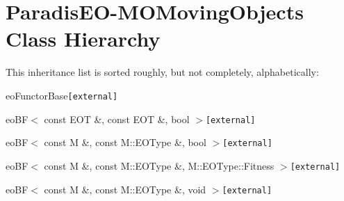 \section{ParadisEO-MOMovingObjects Class Hierarchy}
This inheritance list is sorted roughly, but not completely, alphabetically:\begin{CompactList}
\item {}
\item eoFunctorBase{\tt  [external]}\begin{CompactList}
\item eoBF$<$ const EOT \&, const EOT \&, bool $>${\tt  [external]}\begin{CompactList}
\item {}
\begin{CompactList}
\item {}
\end{CompactList}
\end{CompactList}
\item eoBF$<$ const M \&, const M::EOType \&, bool $>${\tt  [external]}\begin{CompactList}
\item {}
\begin{CompactList}
\item {}
\item {}
\end{CompactList}
\end{CompactList}
\item eoBF$<$ const M \&, const M::EOType \&, M::EOType::Fitness $>${\tt  [external]}\begin{CompactList}
\item {}
\end{CompactList}
\item eoBF$<$ const M \&, const M::EOType \&, void $>${\tt  [external]}\begin{CompactList}
\item {}

\end{CompactList}
\end{CompactList}
\end{CompactList}
